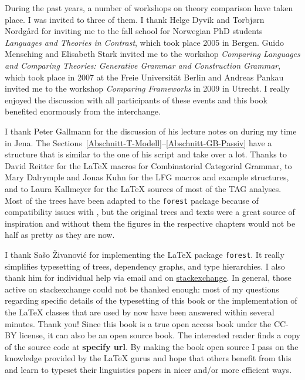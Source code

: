 During the past years, a number of workshops on theory comparison have taken place. I was invited to three of them.
I thank Helge Dyvik and Torbjørn Nordgård for inviting me to the fall school for Norwegian PhD
students  \emph{Languages and Theories in Contrast}, which took place 2005 in Bergen. Guido Mensching and Elisabeth
Stark invited me to the workshop \emph{Comparing Languages and Comparing Theories:
  Generative Grammar and Construction Grammar}, which took place in 2007 at the Freie Universität
Berlin and Andreas Pankau invited me to the workshop \emph{Comparing
  Frameworks} in 2009 in Utrecht. I really enjoyed the discussion with all participants of these
events and this book benefited enormously from the interchange.

I thank Peter Gallmann for the discussion of his lecture notes on \gb
during my time in Jena. The Sections~\ref{Abschnitt-T-Modell}--\ref{Abschnitt-GB-Passiv} have a
structure that is similar to the one of his script and take over a lot. Thanks to David Reitter for
the \LaTeX{} macros for Combinatorial Categorial Grammar, to Mary Dalrymple and Jonas Kuhn for the LFG
macros and example structures, and to Laura Kallmeyer for the \LaTeX{} sources of most of the TAG
analyses. Most of the trees have been adapted to the \texttt{forest} package because of compatibility issues
with \XeLaTeX, but the original trees and texts were a great source of inspiration and without them
the figures in the respective chapters would not be half as pretty as they are now.

I thank Sašo Živanović for implementing the \LaTeX{} package \texttt{forest}. It really simplifies
typesetting of trees, dependency graphs, and type hierarchies. I also thank him for individual help
via email and on \href{http://www.stackexchange.com}{stackexchange}. In general, those active on stackexchange could not be thanked
enough: most of my questions regarding specific details of the typesetting of this book or the
implementation of the \LaTeX{} classes that are used by \lsp now have been answered within several
minutes. Thank you! Since this book is a true open access book under the CC-BY license, it can also
be an open source book. The interested reader finds a copy of the source code at \textbf{specify
  url}. By making the book open source I pass on the knowledge provided by the \LaTeX{} gurus and
hope that others benefit from this and learn to typeset their linguistics papers in nicer and/or
more efficient ways.


